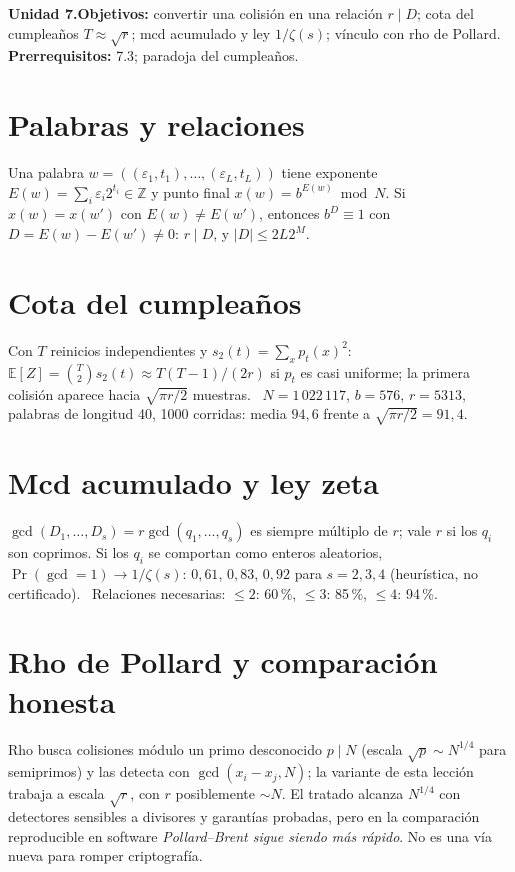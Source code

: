 \documentclass[11pt,a4paper]{article}
\begin{document}

\noindent\textbf{Unidad 7.}\quad\textbf{Objetivos:} convertir una colisión en una relación $r\mid D$; cota del cumpleaños $T\approx\sqrt r$; mcd acumulado y ley
$1/\zeta(s)$; vínculo con rho de Pollard.
\textbf{Prerrequisitos:} 7.3; paradoja del cumpleaños.

\section{Palabras y relaciones}
Una palabra $w=((\varepsilon_1,t_1),\dots,(\varepsilon_L,t_L))$ tiene exponente $E(w)=\sum_i\varepsilon_i2^{t_i}\in\mathbb Z$ y punto final $x(w)=b^{E(w)}\bmod N$.
Si $x(w)=x(w')$ con $E(w)\ne E(w')$, entonces $b^D\equiv1$ con $D=E(w)-E(w')\ne0$: $r\mid D$, y $|D|\le2L2^M$.

\section{Cota del cumpleaños}
Con $T$ reinicios independientes y $s_2(t)=\sum_xp_t(x)^2$: $\mathbb E[Z]=\binom T2s_2(t)\approx T(T-1)/(2r)$ si $p_t$ es casi uniforme; la primera colisión
aparece hacia $\sqrt{\pi r/2}$ muestras.
\evS\ $N=1\,022\,117$, $b=576$, $r=5313$, palabras de longitud 40, 1000 corridas: media $94{,}6$ frente a $\sqrt{\pi r/2}=91{,}4$.

\section{Mcd acumulado y ley zeta}
$\gcd(D_1,\dots,D_s)=r\gcd(q_1,\dots,q_s)$ es siempre múltiplo de $r$; vale $r$ si los $q_i$ son coprimos. Si los $q_i$ se comportan como enteros
aleatorios, $\Pr(\gcd=1)\to1/\zeta(s)$: $0{,}61$, $0{,}83$, $0{,}92$ para $s=2,3,4$ (heurística, no certificado).
\evS\ Relaciones necesarias: $\le2$: 60\,\%, $\le3$: 85\,\%, $\le4$: 94\,\%.

\section{Rho de Pollard y comparación honesta}
Rho busca colisiones módulo un primo desconocido $p\mid N$ (escala $\sqrt p\sim N^{1/4}$ para semiprimos) y las detecta con $\gcd(x_i-x_j,N)$; la variante de esta
lección trabaja a escala $\sqrt r$, con $r$ posiblemente $\sim N$. El tratado alcanza $N^{1/4}$ con detectores sensibles a divisores y garantías probadas, pero en la
comparación reproducible en software \emph{Pollard--Brent sigue siendo más rápido}. No es una vía nueva para romper criptografía.
\end{document}
